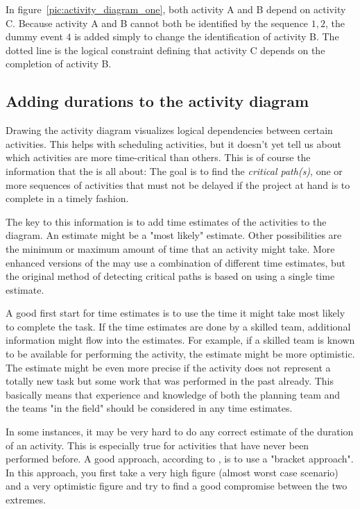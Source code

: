 In figure~\ref{pic:activity_diagram_one}, both activity A and B depend on activity C. Because
activity A and B cannot both be identified by the sequence $1,2$, the dummy event $4$ is added
simply to change the identification of activity B. The dotted line is the logical constraint
defining that activity C depends on the completion of activity B.

\subsection{Adding durations to the activity diagram}
Drawing the activity diagram visualizes logical dependencies between certain activities. This helps
with scheduling activities, but it doesn't yet tell us about which activities are more time-critical
than others. This is of course the information that the \cpm{} is all about: The goal is to find the
\emph{critical path(s)}, one or more sequences of activities that must not be delayed if the project
at hand is to complete in a timely fashion.

The key to this information is to add time estimates of the activities to the diagram. An estimate
might be a "most likely" estimate. Other possibilities are the minimum or maximum amount of time
that an activity might take. More enhanced versions of the \cpm{} may use a combination of different
time estimates, but the original method of detecting critical paths is based on using a single time
estimate. 

A good first start for time estimates is to use the time it might take most likely to complete the
task. If the time estimates are done by a skilled team, additional information might flow into the
estimates. For example, if a skilled team is known to be available for performing the activity, the
estimate might be more optimistic. The estimate might be even more precise if the activity does not
represent a totally new task but some work that was performed in the past already. This basically
means that experience and knowledge of both the planning team and the teams "in the field" should be
considered in any time estimates.

In some instances, it may be very hard to do any correct estimate of the duration of an activity.
This is especially true for activities that have never been performed before. A good approach,
according to \cite[p. 91]{obrien}, is to use a "bracket approach". In this approach, you first take
a very high figure (almost worst case scenario) and a very optimistic figure and try to find a good
compromise between the two extremes.

